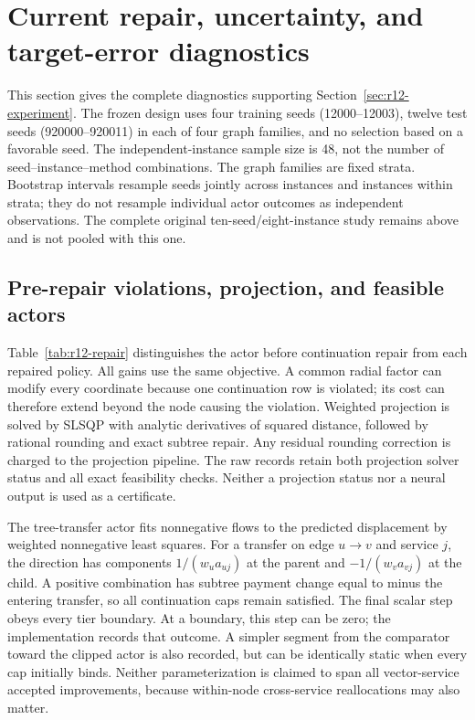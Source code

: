 \section{Current repair, uncertainty, and target-error diagnostics}\label{ec:r12-diagnostics}
This section gives the complete diagnostics supporting Section~\ref{sec:r12-experiment}. The frozen design uses four training seeds (12000--12003), twelve test seeds (920000--920011) in each of four graph families, and no selection based on a favorable seed. The independent-instance sample size is 48, not the number of seed--instance--method combinations. The graph families are fixed strata. Bootstrap intervals resample seeds jointly across instances and instances within strata; they do not resample individual actor outcomes as independent observations. The complete original ten-seed/eight-instance study remains above and is not pooled with this one.

\subsection{Pre-repair violations, projection, and feasible actors}
Table~\ref{tab:r12-repair} distinguishes the actor before continuation repair from each repaired policy. All gains use the same objective. A common radial factor can modify every coordinate because one continuation row is violated; its cost can therefore extend beyond the node causing the violation. Weighted projection is solved by SLSQP with analytic derivatives of squared distance, followed by rational rounding and exact subtree repair. Any residual rounding correction is charged to the projection pipeline. The raw records retain both projection solver status and all exact feasibility checks. Neither a projection status nor a neural output is used as a certificate.

The tree-transfer actor fits nonnegative flows to the predicted displacement by weighted nonnegative least squares. For a transfer on edge $u\to v$ and service $j$, the direction has components $1/(w_ua_{uj})$ at the parent and $-1/(w_va_{vj})$ at the child. A positive combination has subtree payment change equal to minus the entering transfer, so all continuation caps remain satisfied. The final scalar step obeys every tier boundary. At a boundary, this step can be zero; the implementation records that outcome. A simpler segment from the comparator toward the clipped actor is also recorded, but can be identically static when every cap initially binds. Neither parameterization is claimed to span all vector-service accepted improvements, because within-node cross-service reallocations may also matter.


